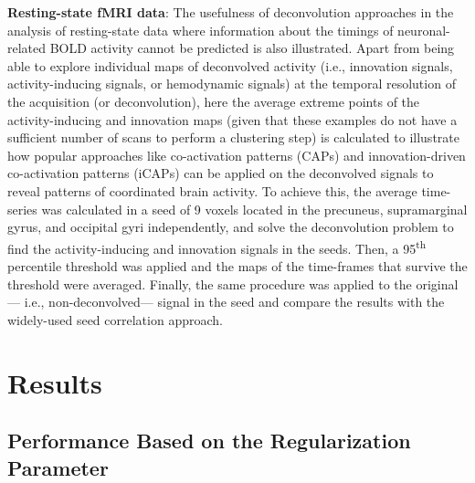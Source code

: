 \textbf{Resting-state fMRI data}: The usefulness of deconvolution approaches in
the analysis of resting-state data where information about the timings of
neuronal-related BOLD activity cannot be predicted is also illustrated. Apart
from being able to explore individual maps of deconvolved activity (i.e.,
innovation signals, activity-inducing signals, or hemodynamic signals) at the
temporal resolution of the acquisition (or deconvolution), here the average
extreme points of the activity-inducing and innovation maps (given that these
examples do not have a sufficient number of scans to perform a clustering step)
is calculated to illustrate how popular approaches like co-activation patterns
(CAPs) \citep{Tagliazucchi2012Criticalitylargescale,Liu2018Coactivationpatterns}
and innovation-driven co-activation patterns (iCAPs)
\citep{Karahanoglu2015Transientbrainactivity} can be applied on the deconvolved
signals to reveal patterns of coordinated brain activity. To achieve this, the
average time-series was calculated in a seed of 9 voxels located in the
precuneus, supramarginal gyrus, and occipital gyri independently, and solve the
deconvolution problem to find the activity-inducing and innovation signals in
the seeds. Then, a 95\textsuperscript{th} percentile threshold was applied and
the maps of the time-frames that survive the threshold were averaged. Finally,
the same procedure was applied to the original--- i.e., non-deconvolved---
signal in the seed and compare the results with the widely-used seed correlation
approach.

\section{Results}
\label{synthesis_results}
\subsection{Performance Based on the Regularization Parameter}
\label{sec:regpath}

